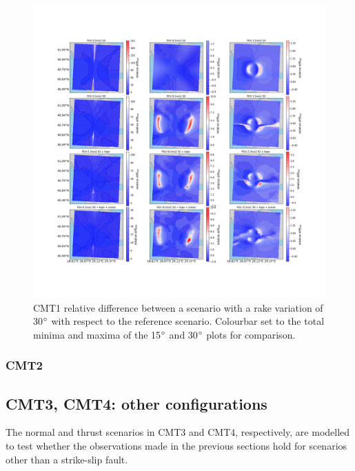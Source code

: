 \documentclass[../Text/00main.tex]{subfiles}
\begin{document}
\begin{figure}[h]
    \centering
    \includegraphics[width=1\linewidth,trim = 2cm 5cm 1cm 5cm, clip]{images_results/rake_variation_epsilon25_sc1.png}
    \caption{CMT1 relative difference between a scenario with a rake variation of 30$\degree$ with respect to the reference scenario. Colourbar set to the total minima and maxima of the 15$\degree$ and 30$\degree$ plots for comparison.}
    \label{fig:ref_eps25-1_rake}
\end{figure}

\subsubsection{CMT2}





\subsection{CMT3, CMT4: other configurations}

The normal and thrust scenarios in CMT3 and CMT4, respectively, are modelled to test whether the observations made in the previous sections hold for scenarios other than a strike-slip fault. 


\FloatBarrier
\end{document}
